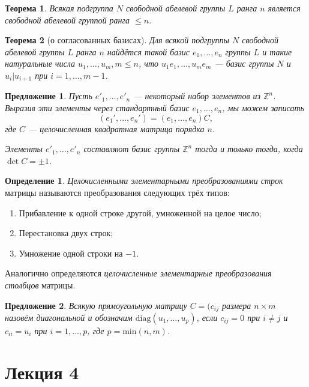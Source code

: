 \documentclass[a4paper]{article}
\theoremstyle{plain}
\newtheorem*{theorem}{Теорема}
\newtheorem{proposal}{Предложение}
\theoremstyle{definition}
\newtheorem{definition}{Определение}
\numberwithin{definition}{section}
\numberwithin{proposal}{section}
\begin{document}
\begin{theorem}
Всякая подгруппа \(N\) свободной абелевой группы \(L\) ранга \(n\) является свободной абелевой группой ранга \(\leqslant n\).
\end{theorem}

\begin{theorem}[о согласованных базисах]
Для всякой подгруппы \(N\) свободной абелевой группы \(L\) ранга \(n\) найдётся такой базис \(e_1, \dots, e_n\) группы \(L\) и такие натуральные числа \(u_1, \dots, u_m, m \leqslant n\), что \(u_1e_1, \dots, u_me_m\) --- базис группы \(N\) и \(u_i | u_{i+1}\) при \(i = 1, \dots, m-1\).
\end{theorem}

\begin{proposal}
Пусть \(e'_1, \dots, e'_n\) --- некоторый набор элементов из \(\mathbb{Z}^n\). Выразив эти элементы через стандартный базис \(e_1, \dots, e_n\), мы можем записать
\begin{equation*}
	(e_1', \dots, e_n') = (e_1, \dots, e_n)C,
\end{equation*}
где \(C\) --- целочисленная квадратная матрица порядка \(n\).

Элементы \(e'_1, \dots, e'_n\) составляют базис группы \(\mathbb{Z}^n\) тогда и только тогда, когда \(\det C = \pm 1\).
\end{proposal}

\begin{definition}
\emph{Целочисленными элементарными преобразованиями строк} матрицы называются преобразования следующих трёх типов:
\begin{enumerate}
	\item Прибавление к одной строке другой, умноженной на целое число;
	\item Перестановка двух строк;
	\item Умножение одной строки на \(-1\).
\end{enumerate}
Аналогично определяются \emph{целочисленные элементарные преобразования столбцов} матрицы.
\end{definition}

\begin{proposal}
Всякую прямоугольную матрицу \(C = (c_{ij}\) размера \(n \times m\) назовём диагональной и обозначим \(\textrm{diag}(u_1, \dots, u_p)\), если \(c_{ij} = 0\) при \(i \neq j\) и \(c_{ii} = u_i\) при \(i = 1, \dots, p\), где \(p = \textrm{min}(n, m)\). 
\end{proposal}


\section{Лекция 4}
\end{document}
